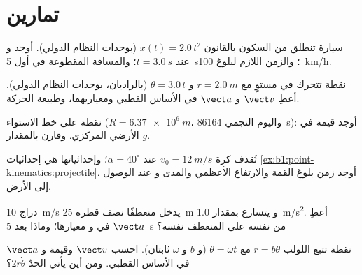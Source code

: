 \section{تمارين}

\begin{exercise}[$\star$]\label{exo:b1:point-kinematics:1}
سيارة تنطلق من السكون بالقانون $x(t) = 2.0\,t^2$ (بوحدات النظام الدولي). أوجد  و
 عند $t = \qty{3.0}{s}$؛ والمسافة المقطوعة في أول
\qty{5}{s}؛ والزمن اللازم لبلوغ \qty{100}{km/h}.
\end{exercise}

\begin{exercise}[$\star$]\label{exo:b1:point-kinematics:2}
نقطة تتحرك في مستوٍ مع $r = \qty{2.0}{m}$ و $\theta = 3.0\,t$
(بالراديان، بوحدات النظام الدولي). أعطِ $\vect v$ و $\vect a$ في الأساس القطبي ومعياريهما،
وطبيعة الحركة.
\end{exercise}

\begin{exercise}[$\star$]\label{exo:b1:point-kinematics:3}
نقطة على خط الاستواء ($R = \qty{6.37e6}{m}$، واليوم النجمي
\qty{86164}{s}): أوجد قيمة   في  الأرضي المركزي.
وقارن  بالمقدار $g$.
\end{exercise}

\begin{exercise}[$\star$]\label{exo:b1:point-kinematics:4}
تُقذف كرة  $v_0 = \qty{12}{m/s}$ عند $\alpha = 40^\circ$؛ وإحداثياتها
هي إحداثيات \cref{ex:b1:point-kinematics:projectile}.
أوجد زمن بلوغ القمة والارتفاع الأعظمي والمدى و
 عند الوصول إلى الأرض.
\end{exercise}

\begin{exercise}[$\star\star$]\label{exo:b1:point-kinematics:5}
دراج  \qty{10}{m/s} يدخل منعطفًا نصف قطره \qty{25}{m} و
يتسارع بمقدار \qty{1.0}{m/s^2}. أعطِ $\vect a$ في  و
معيارها؛ وماذا بعد \qty{5}{s} من  نفسه على المنعطف نفسه؟
\end{exercise}

\begin{exercise}[$\star\star$]\label{exo:b1:point-kinematics:6}
نقطة تتبع اللولب $r = b\theta$ مع $\theta = \omega t$ (و $b$ و
$\omega$ ثابتان). احسب $\vect v$ وقيمة  و $\vect a$ في
الأساس القطبي. ومن أين يأتي الحدّ $2\dot r\dot\theta$؟
\end{exercise}

